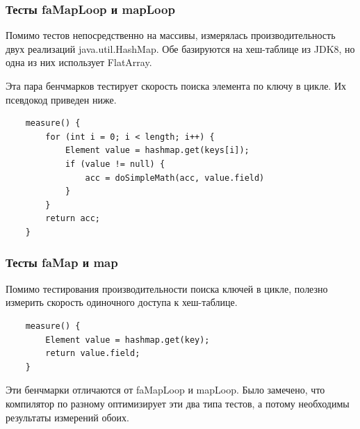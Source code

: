 \subsubsection{Тесты faMapLoop и mapLoop}
Помимо тестов непосредственно на массивы, измерялась производительность двух реализаций java.util.HashMap. 
Обе базируются на хеш-таблице из JDK8, но одна из них использует FlatArray. 
\par
Эта пара бенчмарков тестирует скорость поиска элемента по ключу в цикле. Их псевдокод приведен ниже.
\begin{lstlisting}
	measure() {
		for (int i = 0; i < length; i++) {
			Element value = hashmap.get(keys[i]);
			if (value != null) {
				acc = doSimpleMath(acc, value.field)
			}
		}
		return acc;
	}
\end{lstlisting}

\subsubsection{Тесты faMap и map}
Помимо тестирования производительности поиска ключей в цикле, полезно измерить скорость одиночного доступа к хеш-таблице.
\begin{lstlisting}
	measure() {
		Element value = hashmap.get(key);
		return value.field;
	}
\end{lstlisting}
Эти бенчмарки отличаются от faMapLoop и mapLoop. Было замечено, что компилятор по разному оптимизирует эти два типа тестов, а потому необходимы результаты измерений обоих. 

\clearpage

